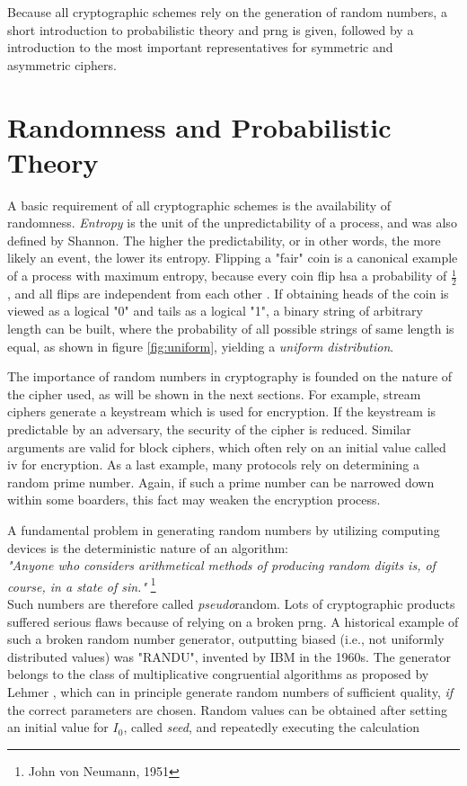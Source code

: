 Because all cryptographic schemes rely on the generation of random numbers, a short introduction to probabilistic theory and \gls{prng} is given,
followed by a introduction to the most important representatives for symmetric and asymmetric ciphers.

\section{Randomness and Probabilistic Theory}

A basic requirement of all cryptographic schemes is the availability of randomness. \textit{Entropy} is the unit of the unpredictability of a process, and was
also defined by Shannon. The higher the predictability, or in other words, the more likely an event, the lower its entropy. Flipping a "fair" coin is a canonical 
example of a process with maximum entropy, because every coin flip hsa a probability of $\frac{1}{2}$, and all flips are independent from each other \cite{1621063}.
If obtaining heads of the coin is viewed as a logical "0" and tails as a logical "1", a binary string of arbitrary length can be built, where the probability of all possible
strings of same length is equal, as shown in figure \ref{fig:uniform}, yielding a \textit{uniform distribution}. 

The importance of random numbers in cryptography is founded on the nature of the cipher used, as will be shown in the next sections. For example,
stream ciphers generate a keystream which is used
for encryption. If the keystream is predictable by an adversary, the security of the cipher is reduced. Similar arguments are valid for block ciphers, which often
rely on an initial value called \gls{iv} for encryption. As a last example, many protocols rely on determining a random prime number. Again, if such a prime number
can be narrowed down within some boarders, this fact may weaken the encryption process.

A fundamental problem in generating random numbers by utilizing computing devices is the deterministic nature of an algorithm:
\\

\textit{"Anyone who considers arithmetical methods of producing random digits is, of course, in a state of sin."} \footnote{John von Neumann, 1951}
\\

Such numbers are therefore called \textit{pseudo}random. Lots of cryptographic products suffered serious flaws because of relying on a broken \gls{prng}. A 
historical example of such a broken random number generator, outputting biased (i.e., not uniformly distributed values) was "RANDU", invented by IBM in the
1960s. 
The generator belongs to the class of multiplicative congruential algorithms as proposed by Lehmer \cite{MR0044899}, which can in principle generate random
numbers of sufficient quality, \textit{if} the correct parameters are chosen.
Random values can be obtained after setting an initial value for $I_0$, called \textit{seed}, and repeatedly executing the calculation

